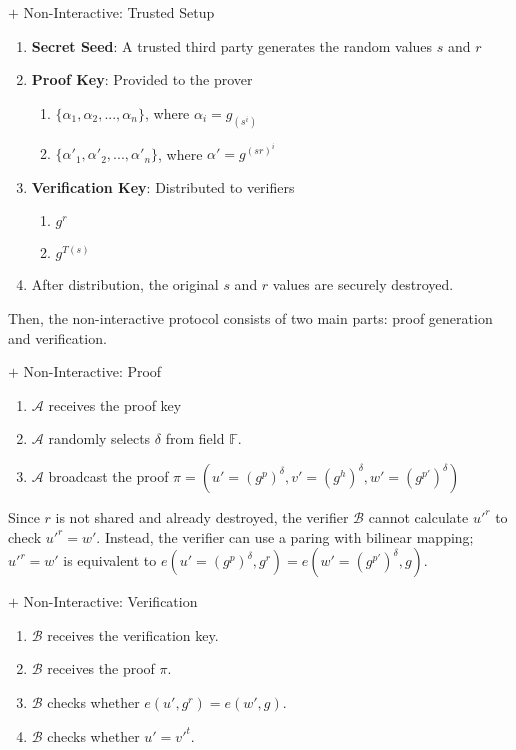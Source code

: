 \documentclass{article}
\begin{document}
\begin{protocol}{$+$ Non-Interactive: Trusted Setup}{}
\begin{enumerate}
    \item \textbf{Secret Seed}: A trusted third party generates the random values $s$ and $r$
    \item \textbf{Proof Key}: Provided to the prover \begin{enumerate}
        \item $\{\alpha_1, \alpha_2, ..., \alpha_{n}\}$, where $\alpha_{i} = g_{(s^i)}$
        \item $\{\alpha'_1, \alpha'_2, ..., \alpha'_{n}\}$, where $\alpha' = g^{(sr)^i}$
        \end{enumerate}
    \item \textbf{Verification Key}: Distributed to verifiers \begin{enumerate}
        \item $g^{r}$
        \item $g^{T(s)}$
    \end{enumerate}
    \item After distribution, the original $s$ and $r$ values are securely destroyed.
\end{enumerate}
\end{protocol}



Then, the non-interactive protocol consists of two main parts: proof generation and verification.

\begin{protocol}{$+$ Non-Interactive: Proof}{}
    \begin{enumerate}
        \item $\mathcal{A}$ receives the proof key
        \item $\mathcal{A}$ randomly selects $\delta$ from field $\mathbb{F}$.
        \item $\mathcal{A}$ broadcast the proof $\pi = (u' = (g^{p})^{\delta}, v' = (g^{h})^{\delta}, w' = (g^{p'})^{\delta})$
    \end{enumerate}
\end{protocol}

Since $r$ is not shared and already destroyed, the verifier $\mathcal{B}$ cannot calculate $u'^{r}$ to check $u'^{r} = w'$. Instead, the verifier can use a paring with bilinear mapping; $u'^{r} = w'$ is equivalent to $e(u' = (g^{p})^{\delta}, g^{r}) = e(w'=(g^{p'})^{\delta}, g)$.

\begin{protocol}{$+$ Non-Interactive: Verification}{}
    \begin{enumerate}
        \item $\mathcal{B}$ receives the verification key.
        \item $\mathcal{B}$ receives the proof $\pi$.
        \item $\mathcal{B}$ checks whether $e(u', g^{r}) = e(w', g)$.
        \item $\mathcal{B}$ checks whether $u' = v'^{t}$.
    \end{enumerate}
\end{protocol}
\end{document}
